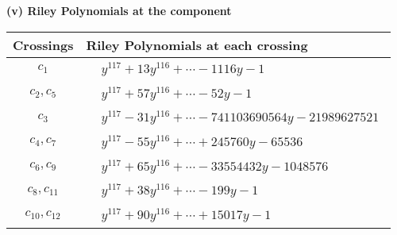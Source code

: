 \documentclass[1p]{elsarticle_modified}
\theoremstyle{definition}
\begin{document}
\flushleft \textbf{(v) Riley Polynomials at the component}\newline \\
\begin{tabular}{m{50pt}|m{274pt}}
Crossings & \hspace{64pt}Riley Polynomials at each crossing \\
\hline $$\begin{aligned}c_{1}\end{aligned}$$&$\begin{aligned}
&y^{117}+13 y^{116}+\cdots-1116 y-1
\end{aligned}$\\
\hline $$\begin{aligned}c_{2},c_{5}\end{aligned}$$&$\begin{aligned}
&y^{117}+57 y^{116}+\cdots-52 y-1
\end{aligned}$\\
\hline $$\begin{aligned}c_{3}\end{aligned}$$&$\begin{aligned}
&y^{117}-31 y^{116}+\cdots-741103690564 y-21989627521
\end{aligned}$\\
\hline $$\begin{aligned}c_{4},c_{7}\end{aligned}$$&$\begin{aligned}
&y^{117}-55 y^{116}+\cdots+245760 y-65536
\end{aligned}$\\
\hline $$\begin{aligned}c_{6},c_{9}\end{aligned}$$&$\begin{aligned}
&y^{117}+65 y^{116}+\cdots-33554432 y-1048576
\end{aligned}$\\
\hline $$\begin{aligned}c_{8},c_{11}\end{aligned}$$&$\begin{aligned}
&y^{117}+38 y^{116}+\cdots-199 y-1
\end{aligned}$\\
\hline $$\begin{aligned}c_{10},c_{12}\end{aligned}$$&$\begin{aligned}
&y^{117}+90 y^{116}+\cdots+15017 y-1
\end{aligned}$\\
\hline
\end{tabular}\\~\\
\end{document}
